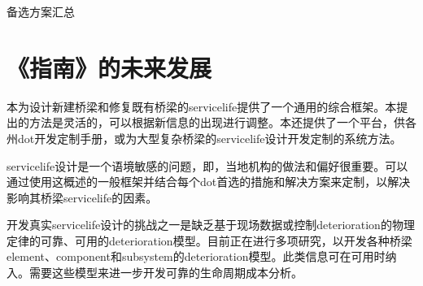 \begin{table}
  \caption{备选方案汇总}\label{tab:alternative-summary}
  
\end{table}

\section{《指南》的未来发展}
本为设计新建桥梁和修复既有桥梁的\gls{servicelife}提供了一个通用的综合框架。本提出的方法是灵活的，可以根据新信息的出现进行调整。本还提供了一个平台，供各州\acrlong{dot}开发定制手册，或为大型复杂桥梁的\gls{servicelife}设计开发定制的系统方法。

\gls{servicelife}设计是一个语境敏感的问题，即，当地机构的做法和偏好很重要。可以通过使用这概述的一般框架并结合每个\gls{dot}首选的措施和解决方案来定制，以解决影响其桥梁\gls{servicelife}的因素。


开发真实\gls*{servicelife}设计的挑战之一是缺乏基于现场数据或控制\gls*{deterioration}的物理定律的可靠、可用的\gls*{deterioration}模型。目前正在进行多项研究，以开发各种桥梁\gls{element}、\gls{component}和\gls{subsystem}的\gls*{deterioration}模型。此类信息可在可用时纳入。需要这些模型来进一步开发可靠的生命周期成本分析。

